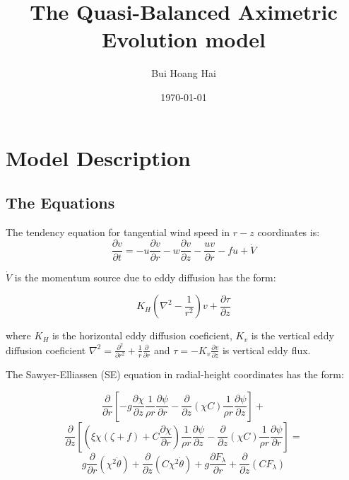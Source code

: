 \documentclass[a4paper,13pt]{article}
\begin{document}
 

\title{The Quasi-Balanced Aximetric Evolution model}
\author{Bui Hoang Hai}
\date{\today}
\maketitle 

\section{Model Description}
\label{sec:ModelDescription}

\subsection{The Equations}
\label{sec:Equations}

The tendency equation for tangential wind speed in $r-z$ coordinates is:
\begin{equation} 
\frac{\partial v}{{\partial t}} = -u\frac{\partial v}{{\partial r}} - w\frac{\partial v}{{\partial z}}
	                                     -\frac{uv}{{\partial r}} -fu + \dot{V} 
\label{eq_tendency}
\end{equation}

$\dot{V}$ is the momentum source due to eddy diffusion has the form:

\[{K_H}\left( {{\nabla ^2} - \frac{1}{{{r^2}}}} \right)v + \frac{{\partial \tau }}{{\partial z}}\]

where $K_H$ is the horizontal eddy diffusion coeficient, $K_v$ is the vertical eddy diffusion coeficient 
${\nabla ^2} = \frac{{{\partial ^2}}}{{\partial {r^2}}} + \frac{1}{r}\frac{\partial }{{\partial r}}$ and
$\tau  = -{K_v}\frac{{\partial v}}{{\partial z}}$ is vertical eddy flux.
  

The Sawyer-Elliassen (SE) equation in radial-height coordinates has the form: 

\[ \frac{\partial }{{\partial r}}\left[ {-g\frac{{\partial \chi }}{{\partial z}}\frac{1}{\rho r}\frac{{\partial \psi }}{{\partial
r}} - \frac{\partial }{{\partial z}}(\chi C)\frac{1}{\rho r}\frac{{\partial \psi }}{{\partial z}}} \right] + \]
\[ \frac{\partial }{{\partial z}}\left[ {\left( {\xi \chi (\zeta + f) + C\frac{{\partial \chi }}{{\partial r}}}
\right)\frac{1}{\rho r}\frac{{\partial \psi }}{{\partial z}} - \frac{\partial }{{\partial z}}(\chi C)\frac{1}{\rho
r}\frac{{\partial \psi }}{{\partial r}}} \right] = \]
\begin{equation}
g\frac{{\partial}}{{\partial r}}\left({\chi^2 \dot \theta}\right) + \frac{\partial }{{\partial z}}\left(C{\chi^2 \dot \theta}\right)
+ g\frac{{\partial F_\lambda}}{{\partial r}} + \frac{\partial }{{\partial z}}\left(CF_\lambda\right)
\label{eq_se}
\end{equation}
\end{document}

